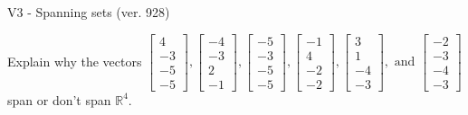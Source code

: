 \begin{exercise}
  \begin{exerciseTitle}V3 - Spanning sets (ver. 928)\end{exerciseTitle}
  \begin{exerciseStatement}
    Explain why the vectors \(\left[\begin{array}{r}
4 \\
-3 \\
-5 \\
-5
\end{array}\right] , \left[\begin{array}{r}
-4 \\
-3 \\
2 \\
-1
\end{array}\right] , \left[\begin{array}{r}
-5 \\
-3 \\
-5 \\
-5
\end{array}\right] , \left[\begin{array}{r}
-1 \\
4 \\
-2 \\
-2
\end{array}\right] , \left[\begin{array}{r}
3 \\
1 \\
-4 \\
-3
\end{array}\right] , \text{ and } \left[\begin{array}{r}
-2 \\
-3 \\
-4 \\
-3
\end{array}\right]\) span or don't span \(\mathbb{R}^4\). 
	



\end{exerciseStatement}
\end{exercise}

